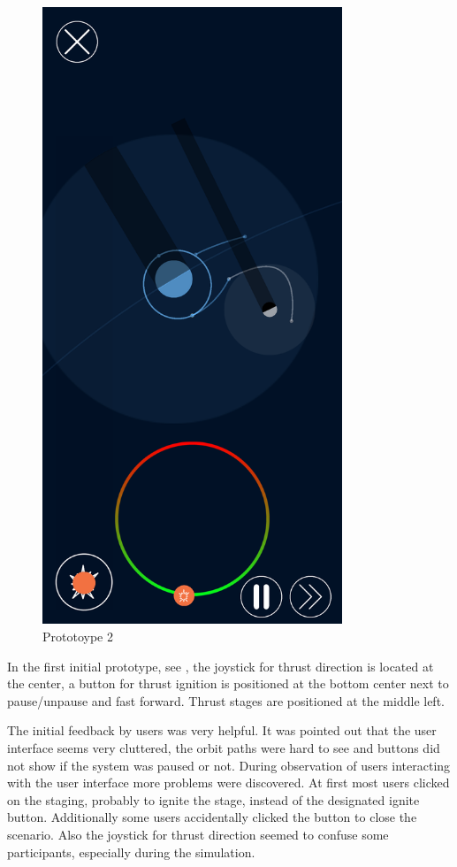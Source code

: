 \documentclass[runningheads]{llncs}
\begin{document}
\begin{figure}[!htb]
\begin{minipage}{0.5\textwidth}
      \includegraphics[width=0.8\textwidth]{Prototype2.png }
      \caption{Prototoype 2 \cite{ref_planeterProto2}}
      \label{fig:prot2}
  \end{minipage}
\end{figure}

In the first initial prototype, see , the joystick for thrust direction is located at the center, a button for thrust
ignition is positioned at the bottom center next to pause/unpause and fast forward. Thrust stages are positioned at the middle
left.

The initial feedback by users was very helpful. It was pointed out that the user interface seems very cluttered, the orbit paths 
were hard to see and buttons did not show if the system was paused or not. During observation of users interacting with the user 
interface more problems were discovered. At first most users clicked on the staging, probably to ignite the stage, instead of the 
designated ignite button. Additionally some users accidentally clicked the button to close the scenario. Also the joystick for thrust 
direction seemed to confuse some participants, especially during the simulation.
\end{document}
